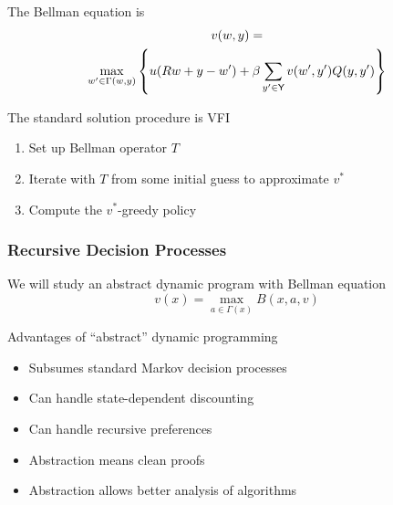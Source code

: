 \begin{frame}
    
    The Bellman equation is
    \begin{multline*}
        v(w, y) = 
        \\
        \max_{w' \in \Gamma(w, y)}
        \left\{
            u(R w + y - w')
            + \beta \sum_{y' \in \mathsf Y} v(w', y') Q(y, y')
        \right\}
    \end{multline*}

        \vspace{0.5em}
        \vspace{0.5em}
    The standard solution procedure is VFI

    \begin{enumerate}
        \item Set up Bellman operator $T$
        \vspace{0.5em}
        \item Iterate with $T$ from some initial guess to approximate $v^*$
        \vspace{0.5em}
        \item Compute the $v^*$-greedy policy
    \end{enumerate}

\end{frame}



\begin{frame}
    \frametitle{Recursive Decision Processes}

    We will study an abstract dynamic program with Bellman equation
    \begin{equation*}
        v(x) = \max_{a \in \Gamma(x)} B(x, a, v)
    \end{equation*}

        \vspace{0.5em}
        \vspace{0.5em}
    Advantages of ``abstract'' dynamic programming

    \begin{itemize}
        \item Subsumes standard Markov decision processes
        \vspace{0.5em}
        \item Can handle state-dependent discounting
        \vspace{0.5em}
        \item Can handle recursive preferences
        \vspace{0.5em}
        \item Abstraction means clean proofs
        \vspace{0.5em}
        \item Abstraction allows better analysis of algorithms
    \end{itemize}

\end{frame}


